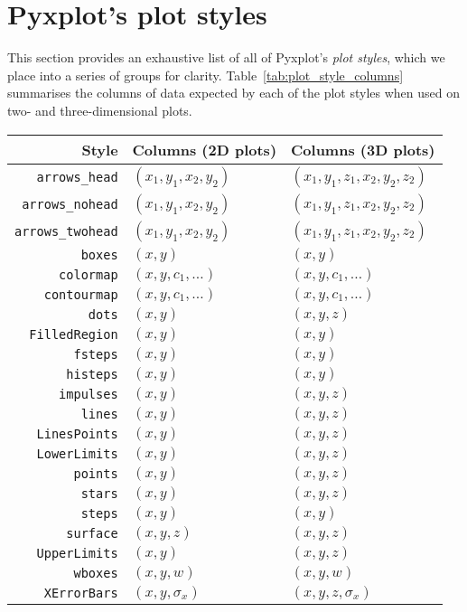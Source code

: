 \section{Pyxplot's plot styles}
\label{sec:list_of_plotstyles}

This section provides an exhaustive list of all of Pyxplot's {\it plot styles},
which we place into a series of groups for clarity.
Table~\ref{tab:plot_style_columns} summarises the columns of data expected by
each of the plot styles when used on two- and three-dimensional plots.

\begin{table}
\begin{tabular}{|rll|}
\hline
{\bf Style} & {\bf Columns (2D plots)} & {\bf Columns (3D plots)} \\
\hline
{\tt arrows\_head} & $(x_1,y_1,x_2,y_2)$ & $(x_1,y_1,z_1,x_2,y_2,z_2)$ \\
{\tt arrows\_nohead} & $(x_1,y_1,x_2,y_2)$ & $(x_1,y_1,z_1,x_2,y_2,z_2)$ \\
{\tt arrows\_twohead} & $(x_1,y_1,x_2,y_2)$ & $(x_1,y_1,z_1,x_2,y_2,z_2)$ \\
{\tt boxes} & $(x,y)$ & $(x,y)$ \\
{\tt colormap} & $(x,y,c_1,\ldots)$ & $(x,y,c_1,\ldots)$ \\
{\tt contourmap} & $(x,y,c_1,\ldots)$ & $(x,y,c_1,\ldots)$ \\
{\tt dots} & $(x,y)$ & $(x,y,z)$ \\
{\tt FilledRegion} & $(x,y)$ & $(x,y)$ \\
{\tt fsteps} & $(x,y)$ & $(x,y)$ \\
{\tt histeps} & $(x,y)$ & $(x,y)$ \\
{\tt impulses} & $(x,y)$ & $(x,y,z)$ \\
{\tt lines} & $(x,y)$ & $(x,y,z)$ \\
{\tt LinesPoints} & $(x,y)$ & $(x,y,z)$ \\
{\tt LowerLimits} & $(x,y)$ & $(x,y,z)$ \\
{\tt points} & $(x,y)$ & $(x,y,z)$ \\
{\tt stars} & $(x,y)$ & $(x,y,z)$ \\
{\tt steps} & $(x,y)$ & $(x,y)$ \\
{\tt surface} & $(x,y,z)$ & $(x,y,z)$ \\
{\tt UpperLimits} & $(x,y)$ & $(x,y,z)$ \\
{\tt wboxes} & $(x,y,w)$ & $(x,y,w)$ \\
{\tt XErrorBars} & $(x,y,\sigma_x)$ & $(x,y,z,\sigma_x)$ \\

\end{tabular}
\end{table}
